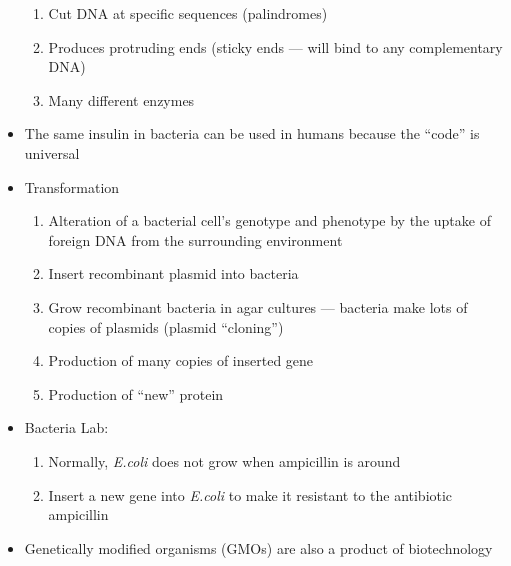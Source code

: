\documentclass[12pt]{article}
\begin{document}
\begin{itemize}
    \begin{enumerate}

      \item Cut DNA at specific sequences (palindromes)

      \item Produces protruding ends (sticky ends — will bind to any complementary DNA)

      \item Many different enzymes 

    \end{enumerate}

  \item The same insulin in bacteria can be used in humans because the “code” is universal

  \item Transformation

    \begin{enumerate}

      \item Alteration of a bacterial cell's genotype and phenotype by the uptake of foreign DNA from the surrounding environment

      \item Insert recombinant plasmid into bacteria

      \item Grow recombinant bacteria in agar cultures — bacteria make lots of copies of plasmids (plasmid “cloning”)

      \item Production of many copies of inserted gene

      \item Production of “new” protein

    \end{enumerate}

  \item Bacteria Lab:

    \begin{enumerate}

      \item Normally, \textit{E.coli} does not grow when ampicillin is around

      \item Insert a new gene into \textit{E.coli} to make it resistant to the antibiotic ampicillin

    \end{enumerate}

  \item Genetically modified organisms (GMOs) are also a product of biotechnology


\end{itemize}
\end{document}
